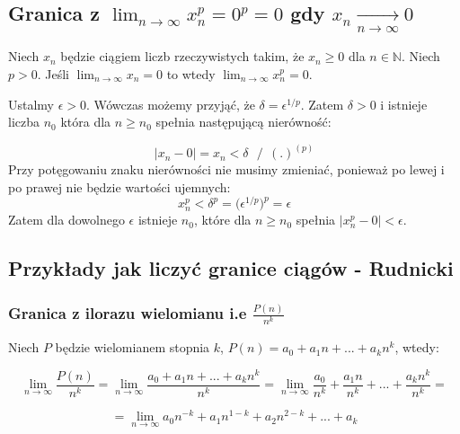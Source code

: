 \documentclass[a4paper,oneside,openright,11pt]{article}
\numberwithin{equation}{section}
\begin{document}
\subsection{Granica z $\lim_{n\to\infty} x_n^p = 0^p = 0$ gdy $x_n \xrightarrow[n \to \infty]{} 0$}


Niech $x_n$ będzie ciągiem liczb rzeczywistych takim, że  $x_n \geq 0$ dla $n \in \mathbb{N}$. Niech $p > 0$.  
Jeśli $\lim_{n\to\infty} x_n = 0$ to wtedy $\lim_{n\to\infty} x_n^p = 0$.

\vspace{10mm}
\noindent

Ustalmy $\epsilon > 0$. Wówczas możemy przyjąć, że $\delta = \epsilon^{1/p}$. Zatem $\delta > 0$ i istnieje liczba $n_0$ która dla $n \geq n_0$
spełnia następującą nierówność:

\begin{equation*}
    |x_n - 0| = x_n < \delta \ \ \ / \ \ (.)^{(p)}
\end{equation*}
Przy potęgowaniu znaku nierówności nie musimy zmieniać, ponieważ po lewej i po prawej nie będzie wartości ujemnych:
\begin{equation*}
    x_n^p < \delta^p = \Big(\epsilon^{1/p}\Big)^p = \epsilon
\end{equation*}
Zatem dla dowolnego $\epsilon$ istnieje $n_0$, które dla $n \geq n_0$ spełnia $|x_{n}^{p} - 0| < \epsilon$.


\subsection{Przykłady jak liczyć granice ciągów - Rudnicki}

\subsubsection{Granica z ilorazu wielomianu i.e $\frac{P(n)}{n^k}$}


Niech $P$ będzie wielomianem stopnia $k$, $P(n) = a_{0} + a_{1}n + \mbox{...} + a_{k}n^{k}$, wtedy:

\begin{equation*}
    \lim_{n\to\infty} \frac{P(n)}{n^k} = \lim_{n\to\infty} \frac{a_{0} + a_{1}n + \mbox{...} + a_{k}n^{k}}{n^k} = \lim_{n\to\infty} \frac{a_{0}}{n^k} + \frac{a_{1}n}{n^k} + \mbox{...} + \frac{a_{k}n^{k}}{n^k} =
\end{equation*}

\begin{equation*}
    = \lim_{n\to\infty} a_{0}n^{-k} + a_{1}n^{1-k} + a_{2}n^{2-k} + \mbox{...} + a_{k} 
\end{equation*}
\end{document}
